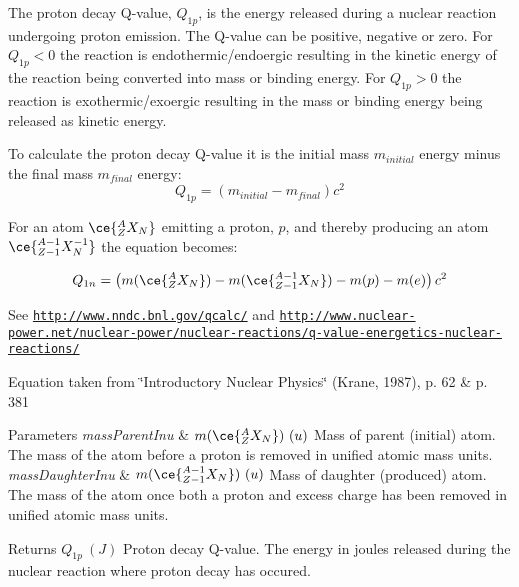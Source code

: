 The proton decay Q-\/value, $Q_{1p}$, is the energy released during a nuclear reaction undergoing proton emission. The Q-\/value can be positive, negative or zero. For $Q_{1p} < 0$ the reaction is endothermic/endoergic resulting in the kinetic energy of the reaction being converted into mass or binding energy. For $Q_{1p} > 0$ the reaction is exothermic/exoergic resulting in the mass or binding energy being released as kinetic energy.

To calculate the proton decay Q-\/value it is the initial mass $m_{initial}$ energy minus the final mass $m_{final}$ energy\+: \[Q_{1p} = \left ( m_{initial}-m_{final}\right ) c^2\]

For an atom $\ce{ ^{A}_{Z}X_{N} }$ emitting a proton, $p$, and thereby producing an atom $\ce{ ^{A-1}_{Z-1}X^{-1}_{N} }$ the equation becomes\+:

\[Q_{1n} = \left ( m(\ce{ ^{A}_{Z}X_{N} }) - m(\ce{ ^{A-1}_{Z-1}X_{N} }) - m(p) - m(e)\right ) c^2\]

See \href{http://www.nndc.bnl.gov/qcalc/}{\tt http\+://www.\+nndc.\+bnl.\+gov/qcalc/} and \href{http://www.nuclear-power.net/nuclear-power/nuclear-reactions/q-value-energetics-nuclear-reactions/}{\tt http\+://www.\+nuclear-\/power.\+net/nuclear-\/power/nuclear-\/reactions/q-\/value-\/energetics-\/nuclear-\/reactions/}

Equation taken from \char`\"{}\+Introductory Nuclear Physics\char`\"{} (Krane, 1987), p. 62 \& p. 381


\begin{DoxyParams}{Parameters}
{\em mass\+Parent\+Inu} & $m(\ce{ ^{A}_{Z}X_{N} })\ (u)$ Mass of parent (initial) atom. The mass of the atom before a proton is removed in unified atomic mass units. \\
\hline
{\em mass\+Daughter\+Inu} & $m(\ce{ ^{A-1}_{Z-1}X_{N} })\ (u)$ Mass of daughter (produced) atom. The mass of the atom once both a proton and excess charge has been removed in unified atomic mass units. \\
\hline
\end{DoxyParams}
\begin{DoxyReturn}{Returns}
$Q_{1p}\ (J)$ Proton decay Q-\/value. The energy in joules released during the nuclear reaction where proton decay has occured. 
\end{DoxyReturn}
\mbox{\label{group___e_g_x_phys-_q_value_ga514354518df3bf1cde561b6d75879ef0}} 
